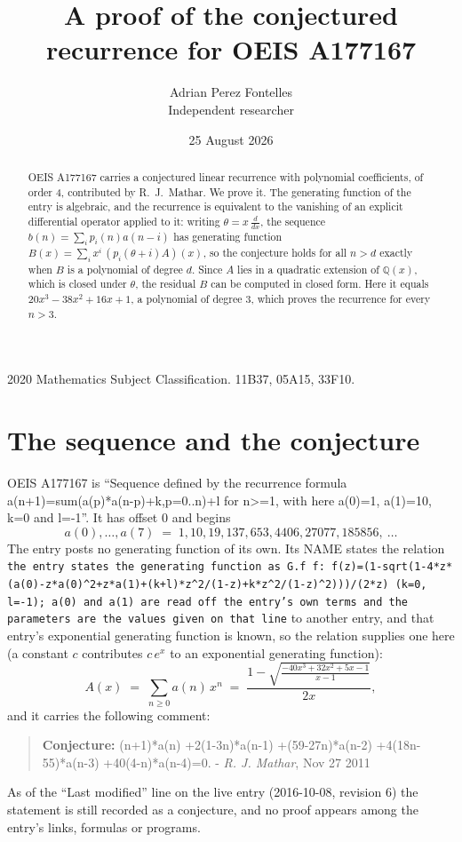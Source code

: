 \documentclass[11pt,a4paper]{article}
\title{A proof of the conjectured recurrence for OEIS A177167}
\author{Adrian Perez Fontelles\\ \small Independent researcher}
\date{25 August 2026}
\theoremstyle{plain}
\theoremstyle{definition}
\begin{document}
\maketitle

\begin{abstract}
OEIS A177167 carries a conjectured linear recurrence with polynomial coefficients, of
order 4, contributed by R.~J.~Mathar. We prove it. The generating function of the
entry is algebraic, and the recurrence is equivalent to the vanishing of an explicit
differential operator applied to it: writing $\theta=x\,\frac{d}{dx}$, the sequence
$b(n)=\sum_{i}p_{i}(n)a(n-i)$ has generating function
$B(x)=\sum_{i}x^{i}\,(p_{i}(\theta+i)A)(x)$, so the conjecture holds for all $n>d$ exactly
when $B$ is a polynomial of degree $d$. Since $A$ lies in a quadratic extension of
$\mathbb{Q}(x)$, which is closed under $\theta$, the residual $B$ can be computed in
closed form. Here it equals $20 x^{3} - 38 x^{2} + 16 x + 1$, a polynomial of degree $3$, which proves
the recurrence for every $n>3$.
\end{abstract}

\noindent\small 2020 Mathematics Subject Classification. 11B37, 05A15, 33F10.\normalsize

\section{The sequence and the conjecture}

OEIS A177167 is ``Sequence defined by the recurrence formula a(n+1)=sum(a(p)*a(n-p)+k,p=0..n)+l for n>=1, with here a(0)=1, a(1)=10, k=0 and l=-1''. It has offset $0$ and begins
\[
a(0),\dots,a(7)\;=\;1, 10, 19, 137, 653, 4406, 27077, 185856,\ \dots
\]
The entry posts no generating function of its own. Its NAME states the
relation \texttt{the entry states the generating function as G.f f: f(z)=(1-sqrt(1-4*z*(a(0)-z*a(0)\textasciicircum{}2+z*a(1)+(k+l)*z\textasciicircum{}2/(1-z)+k*z\textasciicircum{}2/(1-z)\textasciicircum{}2)))/(2*z) (k=0, l=-1); a(0) and a(1) are read off the entry's own terms and the parameters are the values given on that line} to another entry, and that entry's exponential generating
function is known, so the relation supplies one here (a constant $c$ contributes
$c\,e^{x}$ to an exponential generating function):
\begin{equation}\label{eq:gf}
A(x)\;=\;\sum_{n\ge 0} a(n)\,x^{n}\;=\;\frac{1 - \sqrt{\frac{- 40 x^{3} + 32 x^{2} + 5 x - 1}{x - 1}}}{2 x} ,
\end{equation}
and it carries the following comment:
\begin{quote}\small
\textbf{Conjecture:} (n+1)*a(n) +2(1-3n)*a(n-1) +(59-27n)*a(n-2) +4(18n-55)*a(n-3) +40(4-n)*a(n-4)=0. - \emph{R. J. Mathar}, Nov 27 2011
\end{quote}
As of the ``Last modified'' line on the live entry (2016-10-08, revision 6) the
statement is still recorded as a conjecture, and no proof appears among the entry's links,
formulas or programs.
\end{document}
